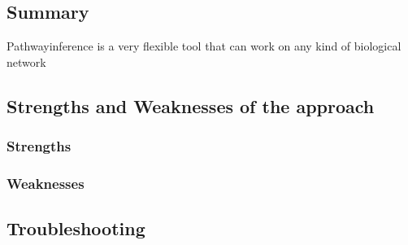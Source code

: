 \subsection{Summary}

Pathwayinference is a very flexible tool that can work on any kind of biological network


\subsection{Strengths and Weaknesses of the approach}


\subsubsection{Strengths}

\subsubsection{Weaknesses}

\subsection{Troubleshooting}